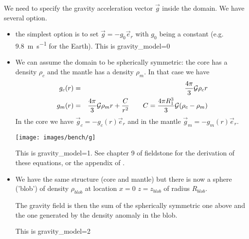 
We need to specify the gravity acceleration vector $\vec{g}$
inside the domain. 
We have several option. 

\begin{itemize}
\item the simplest option is to set $\vec{g} = - g_0 \vec{e}_r$
with $g_0$ being a constant (e.g. 9.8~\si{\meter\per\second} for the Earth).
This is {\python gravity\_model=0}


\item We can assume the domain to be spherically symmetric: 
the core has a density $\rho_c$ and the mantle has a density $\rho_m$.
In that case we have
\begin{eqnarray}
g_c(r)&=& \frac{4\pi}{3} {\cal G}{\rho}_c r \nonumber\\ 
g_m(r)&=& \frac{4\pi}{3} {\cal G}{\rho}_m r +\frac{C}{r^2} 
\qquad C=\frac{4\pi R_1^3}{3} {\cal G} ({\rho}_c-{\rho}_m)
\end{eqnarray}
In the core we have $\vec{g}_c = - g_c(r) \vec{e}_r$
and in the mantle  $\vec{g}_m = - g_m(r) \vec{e}_r$.

\begin{center}
\texttt{[image: images/bench/g]}
\end{center}

This is {\python gravity\_model=1}. See chapter 9 of fieldstone for the derivation 
of these equations, or the appendix of \textcite{thie18}.

\item We have the same 
structure (core and mantle) but there is now a sphere ('blob')
of density $\rho_{blob}$ at location $x=0$ $z=z_{blob}$ of 
radius $R_{blob}$. 

The gravity field is then the sum of the spherically symmetric one 
above and the one generated by the density anomaly in the blob.

This is {\python gravity\_model=2}

\end{itemize}

